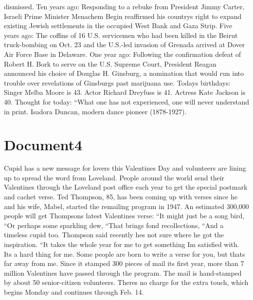 \documentclass{article}
\begin{document}
\color[rgb]{0.9372549019607843,0.48627450980392156,0.396078431372549}dismissed. Ten years ago: Responding to a rebuke from President Jimmy \color[rgb]{0.9137254901960784,0.34509803921568627,0.1568627450980392}Carter, Israeli \color[rgb]{0.7098039215686275,0.00392156862745098,0.15294117647058825}Prime Minister Menachem \color[rgb]{0.9372549019607843,0.48627450980392156,0.396078431372549}Begin reaffirmed his countrys right to expand \color[rgb]{0.9137254901960784,0.34509803921568627,0.1568627450980392}existing Jewish settlements in the occupied West Bank and Gaza Strip. Five years \color[rgb]{0.8666666666666667,0.11372549019607843,0.5411764705882353}ago: The coffins of 16 U.S. servicemen who had been \color[rgb]{0.7098039215686275,0.00392156862745098,0.15294117647058825}killed in the Beirut truck-bombing on Oct. 23 and the \color[rgb]{0.8666666666666667,0.11372549019607843,0.5411764705882353}U.S.-led invasion of Grenada arrived at \color[rgb]{0.9372549019607843,0.48627450980392156,0.396078431372549}Dover \color[rgb]{0.8666666666666667,0.11372549019607843,0.5411764705882353}Air Force Base in Delaware. One year ago: Following the confirmation defeat of \color[rgb]{0.9137254901960784,0.34509803921568627,0.1568627450980392}Robert H. Bork to serve on the U.S. Supreme Court, President Reagan \color[rgb]{0.9372549019607843,0.48627450980392156,0.396078431372549}announced his choice of Douglas H. Ginsburg, a nomination that would run into trouble over revelations of Ginsburgs past \color[rgb]{0.9137254901960784,0.34509803921568627,0.1568627450980392}marijuana \color[rgb]{0.9372549019607843,0.48627450980392156,0.396078431372549}use. Todays birthdays: Singer Melba Moore is 43. Actor Richard Dreyfuss is 41. Actress Kate Jackson is 40. Thought for today: ``What one has not experienced, one will never understand in print.  Isadora Duncan, modern dance pioneer (1878-1927). 

\color[rgb]{0,0,0}\section{Document4}
\color[rgb]{0.9372549019607843,0.48627450980392156,0.396078431372549}Cupid has a new message for lovers this Valentines Day and volunteers are lining up to spread the word from Loveland. People around the world send their Valentines through the Loveland post office each year to get the special postmark and cachet verse. Ted Thompson, 85, has been coming up with verses since he and his wife, Mabel, started the remailing program in 1947. An estimated 300,000 people will get Thompsons latest Valentines verse: ``It might just be a song bird, ``Or perhaps some sparkling dew, ``That brings fond recollections, ``And a timeless cupid too. Thompson said recently hes not sure where he got the inspiration. ``It takes the whole year for me to get something Im satisfied with. Its a hard thing for me. Some people are born to write a verse for you, but thats far away from me. Since it stamped 300 pieces of mail its first year, more than 7 million Valentines have passed through the program. The mail is hand-stamped by about 50 senior-citizen volunteers. Theres no charge for the extra touch, which begins Monday and continues through Feb. 14. 
\end{document}
